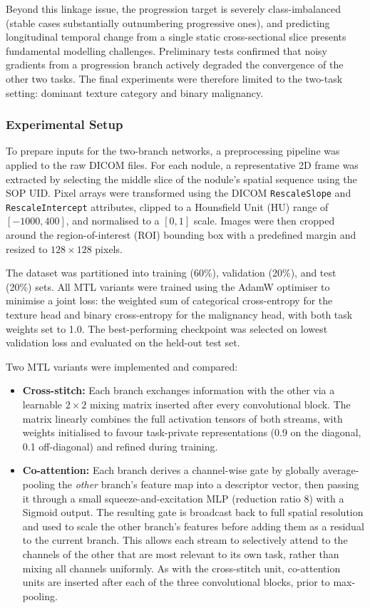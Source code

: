 Beyond this linkage issue, the progression target is severely class-imbalanced (stable cases substantially outnumbering progressive ones), and predicting longitudinal temporal change from a single static cross-sectional slice presents fundamental modelling challenges. Preliminary tests confirmed that noisy gradients from a progression branch actively degraded the convergence of the other two tasks. The final experiments were therefore limited to the two-task setting: dominant texture category and binary malignancy.

\subsubsection{Experimental Setup}

To prepare inputs for the two-branch networks, a preprocessing pipeline was applied to the raw DICOM files. For each nodule, a representative 2D frame was extracted by selecting the middle slice of the nodule's spatial sequence using the SOP UID\@. Pixel arrays were transformed using the DICOM \texttt{RescaleSlope} and \texttt{RescaleIntercept} attributes, clipped to a Hounsfield Unit (HU) range of $[-1000, 400]$, and normalised to a $[0, 1]$ scale. Images were then cropped around the region-of-interest (ROI) bounding box with a predefined margin and resized to $128 \times 128$ pixels.

The dataset was partitioned into training (60\%), validation (20\%), and test (20\%) sets. All MTL variants were trained using the AdamW optimiser to minimise a joint loss: the weighted sum of categorical cross-entropy for the texture head and binary cross-entropy for the malignancy head, with both task weights set to 1.0. The best-performing checkpoint was selected on lowest validation loss and evaluated on the held-out test set.

Two MTL variants were implemented and compared:

\begin{itemize}
  \item \textbf{Cross-stitch:} Each branch exchanges information with the other via a learnable $2 \times 2$ mixing matrix inserted after every convolutional block. The matrix linearly combines the full activation tensors of both streams, with weights initialised to favour task-private representations (0.9 on the diagonal, 0.1 off-diagonal) and refined during training.

  \item \textbf{Co-attention:} Each branch derives a channel-wise gate by globally average-pooling the \textit{other} branch's feature map into a descriptor vector, then passing it through a small squeeze-and-excitation MLP (reduction ratio 8) with a Sigmoid output. The resulting gate is broadcast back to full spatial resolution and used to scale the other branch's features before adding them as a residual to the current branch. This allows each stream to selectively attend to the channels of the other that are most relevant to its own task, rather than mixing all channels uniformly. As with the cross-stitch unit, co-attention units are inserted after each of the three convolutional blocks, prior to max-pooling.
\end{itemize}

